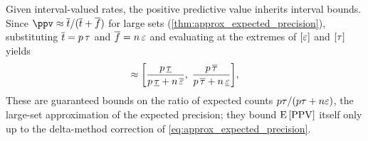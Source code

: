 \begin{example}
\label{ex:interval_ppv}
Given interval-valued rates, the positive predictive value inherits interval bounds.
Since $\ppv \approx \overline{t}/(\overline{t} + \overline{f})$ for large sets (\cref{thm:approx_expected_precision}), substituting $\overline{t} = p\,\tau$ and $\overline{f} = n\,\varepsilon$ and evaluating at the extremes of $[\varepsilon]$ and $[\tau]$ yields
\begin{equation}
[\ppv] \approx \biggl[\frac{p\,\underline{\tprate}}{p\,\underline{\tprate} + n\,\overline{\fprate}},\; \frac{p\,\overline{\tprate}}{p\,\overline{\tprate} + n\,\underline{\fprate}}\biggr],
\end{equation}
These are guaranteed bounds on the ratio of expected counts $p\tau/(p\tau + n\varepsilon)$, the large-set approximation of the expected precision; they bound $\Expect{\PPV}$ itself only up to the delta-method correction of \cref{eq:approx_expected_precision}.
\end{example}
